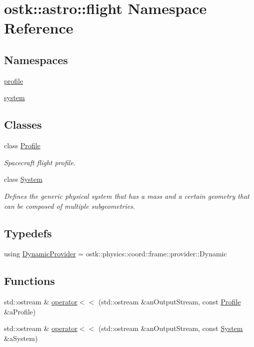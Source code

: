 \hypertarget{namespaceostk_1_1astro_1_1flight}{}\section{ostk\+:\+:astro\+:\+:flight Namespace Reference}
\label{namespaceostk_1_1astro_1_1flight}
\subsection*{Namespaces}
\begin{DoxyCompactItemize}
\item 
 \hyperlink{namespaceostk_1_1astro_1_1flight_1_1profile}{profile}
\item 
 \hyperlink{namespaceostk_1_1astro_1_1flight_1_1system}{system}
\end{DoxyCompactItemize}
\subsection*{Classes}
\begin{DoxyCompactItemize}
\item 
class \hyperlink{classostk_1_1astro_1_1flight_1_1_profile}{Profile}
\begin{DoxyCompactList}\small\item\em Spacecraft flight profile. \end{DoxyCompactList}\item 
class \hyperlink{classostk_1_1astro_1_1flight_1_1_system}{System}
\begin{DoxyCompactList}\small\item\em Defines the generic physical system that has a mass and a certain geometry that can be composed of multiple subgeometries. \end{DoxyCompactList}\end{DoxyCompactItemize}
\subsection*{Typedefs}
\begin{DoxyCompactItemize}
\item 
using \hyperlink{namespaceostk_1_1astro_1_1flight_a30fb17f0f77e97e4d6bb5567218816bd}{Dynamic\+Provider} = ostk\+::physics\+::coord\+::frame\+::provider\+::\+Dynamic
\end{DoxyCompactItemize}
\subsection*{Functions}
\begin{DoxyCompactItemize}
\item 
std\+::ostream \& \hyperlink{namespaceostk_1_1astro_1_1flight_ad4a6bc77a55e55a29abdc5b4e3d8a346}{operator$<$$<$} (std\+::ostream \&an\+Output\+Stream, const \hyperlink{classostk_1_1astro_1_1flight_1_1_profile}{Profile} \&a\+Profile)
\item 
std\+::ostream \& \hyperlink{namespaceostk_1_1astro_1_1flight_a634c76052b78e11d9f56d11ac989fc20}{operator$<$$<$} (std\+::ostream \&an\+Output\+Stream, const \hyperlink{classostk_1_1astro_1_1flight_1_1_system}{System} \&a\+System)
\end{DoxyCompactItemize}


